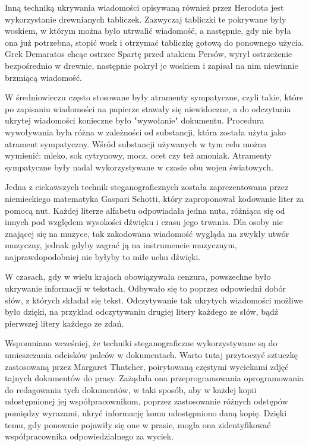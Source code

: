 \documentclass[a4paper, twoside, 12pt]{report}
\begin{document}
        Inną techniką ukrywania wiadomości opisywaną również przez Herodota
        jest wykorzystanie drewnianych tabliczek. Zazwyczaj tabliczki te pokrywane
        były woskiem, w którym można było utrwalić wiadomość, a następnie, gdy
        nie była ona już potrzebna, stopić wosk i otrzymać tabliczkę gotową do
        ponownego użycia. Grek Demaratos chcąc ostrzec Spartę przed atakiem Persów,
        wyrył ostrzeżenie bezpośrednio w drewnie, następnie pokrył je woskiem
        i zapisał na nim niewinnie brzmiącą wiadomość.

        W średniowieczu często stosowane były atramenty sympatyczne, czyli takie,
        które po zapisaniu wiadomości na papierze stawały się niewidoczne, a do
        odczytania ukrytej wiadomości konieczne było "wywołanie" dokumentu. Procedura
        wywoływania była różna w zależności od substancji, która została użyta jako
        atrament sympatyczny. Wśród substancji używanych w tym celu można wymienić:
        mleko, sok cytrynowy, mocz, ocet czy też amoniak. Atramenty sympatyczne
        były nadal wykorzystywane w czasie obu wojen światowych.

        Jedna z ciekawszych technik steganograficznych została zaprezentowana przez
        niemieckiego matematyka Gaspari Schotti\cite{NUTYSTEGANOGRAFIA},
        który zaproponował kodowanie liter za pomocą nut. Każdej literze alfabetu
        odpowiadała jedna nuta, różniąca się od innych pod względem wysokości
        dźwięku i czasu jego trwania. Dla osoby nie znającej się na muzyce, tak zakodowana
        wiadomość wygląda na zwykły utwór muzyczny, jednak gdyby zagrać ją na instrumencie
        muzycznym, najprawdopodobniej nie byłyby to miłe uchu dźwięki.

        W czasach, gdy w wielu krajach obowiązywała cenzura, powszechne było ukrywanie
        informacji w tekstach. Odbywało się to poprzez odpowiedni dobór słów,
        z których składał się tekst. Odczytywanie tak ukrytych wiadomości możliwe było
        dzięki, na przykład odczytywaniu drugiej litery każdego ze słów, bądź pierwszej
        litery każdego ze zdań.

        Wspomniano wcześniej, że techniki steganograficzne wykorzystywane są do umieszczania
        odcisków palców w dokumentach. Warto tutaj przytoczyć sztuczkę zastosowaną
        przez Margaret Thatcher, poirytowaną częstymi wyciekami zdjęć tajnych dokumentów
        do prasy. Zażądała ona przeprogramowania oprogramowania do redagowania tych
        dokumentów, w taki sposób, aby w każdej kopii udostępnionej jej współpracownikom,
        poprzez zastosowanie różnych odstępów pomiędzy wyrazami, ukryć informację
        komu udostępniono daną kopię. Dzięki temu, gdy ponownie pojawiły się one w
        prasie, mogła ona zidentyfikować współpracownika odpowiedzialnego za wyciek.\cite{DIGITALWATERMARKING}
\end{document}
